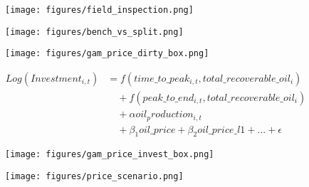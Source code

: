\documentclass{beamer}
\begin{document}
\begin{frame}[plain]
	\begin{figure}
		\texttt{[image: figures/field\_inspection.png]}
		\caption*{}
		\label{field_inspection}
	\end{figure}
\end{frame}


\begin{frame}[plain]
	\begin{figure}
		\texttt{[image: figures/bench\_vs\_split.png]}
		\caption*{}
		\label{bench_vs_split}
	\end{figure}
\end{frame}


\begin{frame}[plain]
	\begin{figure}
		\texttt{[image: figures/gam\_price\_dirty\_box.png]}
		\caption*{}
		\label{gam_price_dirty_box}
	\end{figure}
\end{frame}


\begin{frame}[plain]
	\begin{equation}
	\begin{split}
		Log(Investment_{i,t})&=f(time\_to\_peak_{i,t}, total\_recoverable\_oil_i) \\
		& \quad + f(peak\_to\_end_{i,t}, total\_recoverable\_oil_i) \\
		& \quad + \alpha oil_production_{i,t} \\
		& \quad + \beta_1 oil\_price + \beta_2 oil\_price\_l1 + ... +  \epsilon
	\end{split}
	\label{gam_invest_eqn}
	\end{equation}
\end{frame}


\begin{frame}[plain]
	\begin{figure}
		\texttt{[image: figures/gam\_price\_invest\_box.png]}
		\caption*{}
		\label{gam_price_invest_box}
	\end{figure}
\end{frame}

\begin{frame}[plain]

	\begin{figure}
		\texttt{[image: figures/price\_scenario.png]}
		\caption*{}
		\label{price_scenario}
\end{figure}
\end{frame}
\end{document}
